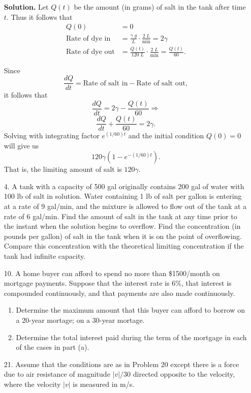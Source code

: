 \documentclass[9pt]{article}
\begin{document}
\begin{enumerate}
      \textbf{Solution.} Let $Q(t)$ be the amount (in grams) of salt in the tank
      after time $t$. Thus it follows that
      \begin{align*}
         Q(0) &= 0 \\
         \text{Rate of dye in}&=\frac{\gamma\;g}{L}\cdot\frac{2\;L}
            {\text{min}}=2\gamma \\
         \text{Rate of dye out}&=\frac{Q(t)}{120\;L}\cdot\frac{2\;L}{\text{min}}
            = \frac{Q(t)}{60}.
      \end{align*}
      
      Since
      $$\frac{dQ}{dt} = \text{Rate of salt in} - \text{Rate of salt out},$$
      it follows that
      $$\frac{dQ}{dt} = 2\gamma - \frac{Q(t)}{60} \Rightarrow$$
      $$\frac{dQ}{dt} + \frac{Q(t)}{60} = 2\gamma.$$
      Solving with integrating factor $e^{(1/60)t}$ and the initial condition
      $Q(0) = 0$ will give us
      $$120\gamma(1 - e^{-(1/60)t}).$$
      That is, the limiting amount of salt is $120\gamma$.
   \item[4.]   A tank with a capacity of 500 gal originally contains 200 gal of
               water with 100 lb of salt in solution. Water containing 1 lb of
               salt per gallon is entering at a rate of 9 gal/min, and the
               mixture is allowed to flow out of the tank at a rate of
               6 gal/min. Find the amount of salt in the tank at any time prior
               to the instant when the solution begins to overflow. Find the
               concentration (in pounds per gallon) of salt in the tank when it
               is on the point of overflowing. Compare this concentration with
               the theoretical limiting concentration if the tank had infinite
               capacity.
   \item[10.]  A home buyer can afford to spend no more than \$1500/month on
               mortgage payments. Suppose that the interest rate is 6\%, that
               interest is compounded continuously, and that payments are also
               made continuously.

               \begin{enumerate}
                  \item Determine the maximum amount that this buyer can afford
                        to borrow on a 20-year mortage; on a 30-year mortage.
                  \item Determine the total interest paid during the term of the
                        mortgage in each of the cases in part (a).
               \end{enumerate}
   \item[21.]  Assume that the conditions are as in Problem 20 except there is a
               force due to air resistance of magnitude $|v|/30$ directed
               opposite to the velocity, where the velocity $|v|$ is measured in
               m/s.


\end{enumerate}
\end{document}
